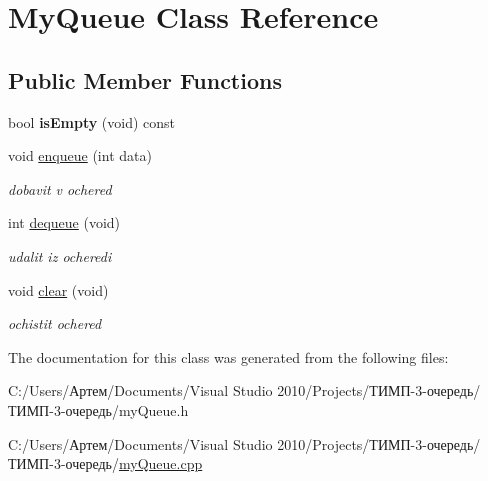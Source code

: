 \hypertarget{class_my_queue}{}\section{My\+Queue Class Reference}
\label{class_my_queue}
\subsection*{Public Member Functions}
\begin{DoxyCompactItemize}
\item 
\hypertarget{class_my_queue_a15d0ed79be143627aa10d976d94196d5}{}bool {\bfseries is\+Empty} (void) const \label{class_my_queue_a15d0ed79be143627aa10d976d94196d5}

\item 
\hypertarget{class_my_queue_a1212da8f0a7ebee17be12d71d6103857}{}void \hyperlink{class_my_queue_a1212da8f0a7ebee17be12d71d6103857}{enqueue} (int data)\label{class_my_queue_a1212da8f0a7ebee17be12d71d6103857}

\begin{DoxyCompactList}\small\item\em dobavit\textquotesingle{} v ochered\textquotesingle{} \end{DoxyCompactList}\item 
\hypertarget{class_my_queue_aa4aa519f0bb93fab2a941b066b30adb2}{}int \hyperlink{class_my_queue_aa4aa519f0bb93fab2a941b066b30adb2}{dequeue} (void)\label{class_my_queue_aa4aa519f0bb93fab2a941b066b30adb2}

\begin{DoxyCompactList}\small\item\em udalit\textquotesingle{} iz ocheredi \end{DoxyCompactList}\item 
\hypertarget{class_my_queue_a7767c825108e850ad1723eba1db0ac74}{}void \hyperlink{class_my_queue_a7767c825108e850ad1723eba1db0ac74}{clear} (void)\label{class_my_queue_a7767c825108e850ad1723eba1db0ac74}

\begin{DoxyCompactList}\small\item\em ochistit\textquotesingle{} ochered\textquotesingle{} \end{DoxyCompactList}\end{DoxyCompactItemize}


The documentation for this class was generated from the following files\+:\begin{DoxyCompactItemize}
\item 
C\+:/\+Users/Артем/\+Documents/\+Visual Studio 2010/\+Projects/ТИМП-\/3-\/очередь/ТИМП-\/3-\/очередь/my\+Queue.\+h\item 
C\+:/\+Users/Артем/\+Documents/\+Visual Studio 2010/\+Projects/ТИМП-\/3-\/очередь/ТИМП-\/3-\/очередь/\hyperlink{my_queue_8cpp}{my\+Queue.\+cpp}\end{DoxyCompactItemize}
